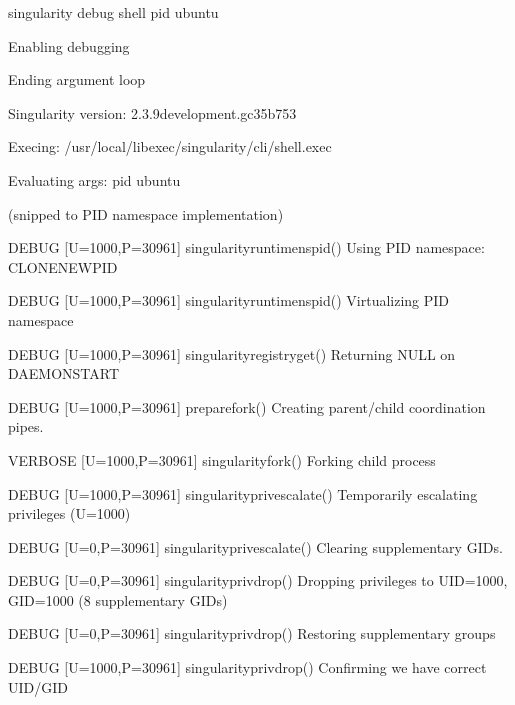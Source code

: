 \documentclass[letterpaper,10pt,english]{sphinxmanual}
\begin{document}
%
\begin{sphinxVerbatim}[commandchars=\\\{\}]
\PYGZdl{} singularity \PYGZhy{}\PYGZhy{}debug shell \PYGZhy{}\PYGZhy{}pid ubuntu

Enabling debugging

Ending argument loop

Singularity version: 2.3.9\PYGZhy{}development.gc35b753

Exec\PYGZsq{}ing: /usr/local/libexec/singularity/cli/shell.exec

Evaluating args: \PYGZsq{}\PYGZhy{}\PYGZhy{}pid ubuntu\PYGZsq{}
\end{sphinxVerbatim}

(snipped to PID namespace implementation)

%
\begin{sphinxVerbatim}[commandchars=\\\{\}]
DEBUG   [U=1000,P=30961]   singularity\PYGZus{}runtime\PYGZus{}ns\PYGZus{}pid()              Using PID namespace: CLONE\PYGZus{}NEWPID

DEBUG   [U=1000,P=30961]   singularity\PYGZus{}runtime\PYGZus{}ns\PYGZus{}pid()              Virtualizing PID namespace

DEBUG   [U=1000,P=30961]   singularity\PYGZus{}registry\PYGZus{}get()                Returning NULL on \PYGZsq{}DAEMON\PYGZus{}START\PYGZsq{}

DEBUG   [U=1000,P=30961]   prepare\PYGZus{}fork()                            Creating parent/child coordination pipes.

VERBOSE [U=1000,P=30961]   singularity\PYGZus{}fork()                        Forking child process

DEBUG   [U=1000,P=30961]   singularity\PYGZus{}priv\PYGZus{}escalate()               Temporarily escalating privileges (U=1000)

DEBUG   [U=0,P=30961]      singularity\PYGZus{}priv\PYGZus{}escalate()               Clearing supplementary GIDs.

DEBUG   [U=0,P=30961]      singularity\PYGZus{}priv\PYGZus{}drop()                   Dropping privileges to UID=1000, GID=1000 (8 supplementary GIDs)

DEBUG   [U=0,P=30961]      singularity\PYGZus{}priv\PYGZus{}drop()                   Restoring supplementary groups

DEBUG   [U=1000,P=30961]   singularity\PYGZus{}priv\PYGZus{}drop()                   Confirming we have correct UID/GID


\end{sphinxVerbatim}
\end{document}

